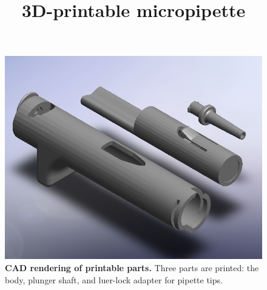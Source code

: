 \documentclass[]{article}
\title{3D-printable micropipette}
\author{}
\begin{document}
\maketitle

\begin{figure}
\includegraphics[scale=0.4]{fig1.PNG} %
\caption{
{\bf CAD rendering of printable parts.}  Three parts are printed: the body, plunger shaft, and luer-lock adapter for pipette tips.
}
\label{figure1}
\end{figure}
\end{document}
